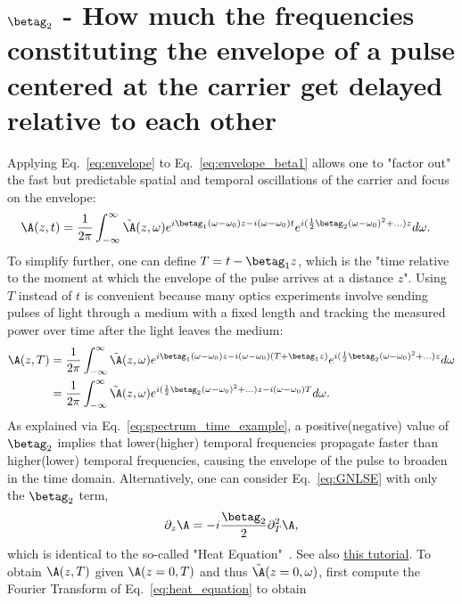 \section{$\betag_2$ - How much the frequencies constituting the envelope of a pulse centered at the carrier get delayed relative to each other}
\label{sec:GVD}
Applying Eq.~\ref{eq:envelope} to Eq.~\ref{eq:envelope_beta1} allows one to "factor out" the fast but predictable spatial and temporal oscillations of the carrier and focus on the envelope:
\begin{align}
    \A(z,t)  &= \frac{1}{2\pi}  \int_{-\infty}^{\infty} \Tilde{\A}(z,\omega) e^{i\betag_1(\omega-\omega_0)z-i(\omega-\omega_0) t} e^{i(\frac{1}{2}\betag_2(\omega-\omega_0)^2+...)z} d\omega.
\end{align}
To simplify further, one can define $T=t-\betag_1z$, which is the "time relative to the moment at which the envelope of the pulse arrives at a distance $z$". Using $T$ instead of $t$ is convenient because many optics experiments involve sending pulses of light through a medium with a fixed length and tracking the measured power over time after the light leaves the medium:   
\begin{align}
    \A(z,T)  &= \frac{1}{2\pi}  \int_{-\infty}^{\infty} \Tilde{\A}(z,\omega) e^{i\betag_1(\omega-\omega_0)z-i(\omega-\omega_0) (T+\betag_1z)} e^{i(\frac{1}{2}\betag_2(\omega-\omega_0)^2+...)z} d\omega \\ \nonumber
    &= \frac{1}{2\pi}  \int_{-\infty}^{\infty} \Tilde{\A}(z,\omega) e^{i(\frac{1}{2}\betag_2(\omega-\omega_0)^2+...)z-i(\omega-\omega_0)T} d\omega.
\end{align} 
As explained via Eq.~\ref{eq:spectrum_time_example}, a positive(negative) value of $\betag_2$ implies that lower(higher) temporal frequencies propagate faster than higher(lower) temporal frequencies, causing the envelope of the pulse to broaden in the time domain. Alternatively, one can consider Eq.~\ref{eq:GNLSE} with only the $\betag_2$ term,
\begin{align}
    \label{eq:heat_equation}
    \partial_z \A = -i  \frac{\betag_2}{2}\partial_T^2\A,
\end{align}
which is identical to the so-called "Heat Equation"~\cite{Fourier_heat_original,Fourier_heat_english}. See also 
\href{https://digitalcommons.ursinus.edu/cgi/viewcontent.cgi?article=1008&context=triumphs_differ}{this tutorial}. To obtain $\A(z,T)$ given $\A(z=0,T)$ and thus $\tilde{\A}(z=0,\omega)$, first compute the Fourier Transform of Eq.~\ref{eq:heat_equation} to obtain
